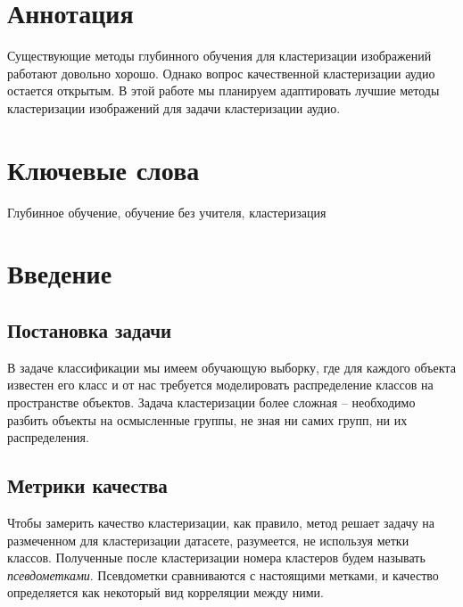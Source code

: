 \documentclass[a4paper,12pt]{extarticle}
\begin{document}
\newpage
\setcounter{page}{2}

{
	\hypersetup{linkcolor=black}
	\tableofcontents
}

\newpage

\newpage
\section*{Аннотация}   %
    Существующие методы глубинного обучения для кластеризации 
    изображений работают довольно хорошо. Однако вопрос качественной
    кластеризации аудио остается открытым. В этой работе мы планируем
    адаптировать лучшие методы кластеризации изображений для 
    задачи кластеризации аудио.


\section*{Ключевые слова}
Глубинное обучение, обучение без учителя, кластеризация
\pagebreak

\section{Введение}

\subsection{Постановка задачи}

В задаче классификации мы имеем обучающую выборку, где для каждого объекта
известен его класс и от нас требуется моделировать распределение
классов на пространстве объектов. Задача кластеризации более сложная
-- необходимо разбить объекты на осмысленные группы, не зная ни 
самих групп, ни их распределения.

\subsection{Метрики качества}

Чтобы замерить качество кластеризации, как правило, метод
решает задачу на размеченном для кластеризации датасете, 
разумеется, не используя метки классов. Полученные после 
кластеризации номера кластеров будем называть \textit{псевдометками}.
Псевдометки сравниваются с настоящими метками,
и качество определяется как некоторый вид корреляции между ними.
\end{document}
